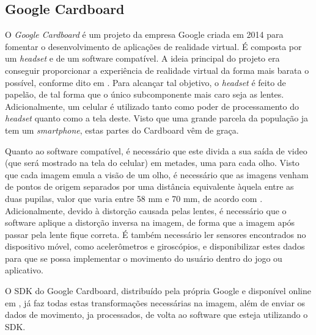 
\subsection{Google Cardboard}\label{subsec-teo-google-cardboard}

O \textit{Google Cardboard} é um projeto da empresa Google criada em 2014 para 
fomentar o desenvolvimento de aplicações de realidade virtual. É composta por um 
\textit{headset} e de um software compatível. A ideia principal do projeto era
conseguir proporcionar a experiência de realidade virtual da forma mais barata 
o possível, conforme dito em \cite{cnet:2016:google-cardboard}. Para 
alcançar tal objetivo, o \textit{headset} é feito de papelão, 
de tal forma que o único subcomponente mais caro seja as lentes. Adicionalmente, 
um celular é utilizado tanto como poder de processamento do \textit{headset} 
quanto como a tela deste. Visto que uma grande parcela da população ja tem um 
\textit{smartphone}, estas partes do Cardboard vêm de graça.

Quanto ao software compatível, é necessário que este divida a sua saída de 
video (que será mostrado na tela do celular) em metades, uma para cada olho. 
Visto que cada imagem emula a visão de um olho, é necessário que as imagens 
venham de pontos de origem separados por uma distância equivalente àquela entre 
as duas pupilas, valor que varia entre 58 mm e 70 mm, de acordo com
\cite{dodgson:2004:svariation}. Adicionalmente, devido à distorção causada 
pelas lentes, é necessário que o software aplique a distorção inversa na imagem, 
de forma que a imagem após passar pela lente fique correta. É também necessário 
ler sensores encontrados no dispositivo móvel, como acelerômetros e giroscópios, 
e disponibilizar estes dados para que se possa implementar o movimento do 
usuário dentro do jogo ou aplicativo.

O SDK do Google Cardboard, distribuído pela própria Google e disponível online 
em \cite{google:2016:cardboardSDK}, já faz todas estas transformações necessárias 
na imagem, além de enviar os dados de movimento, ja processados, de volta ao
software que esteja utilizando o SDK.
